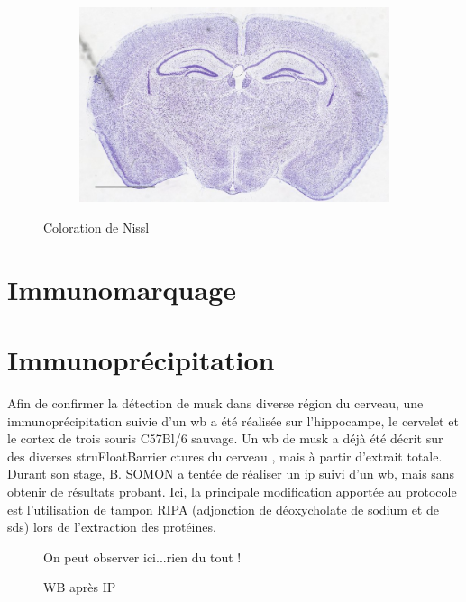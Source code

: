 \begin{figure}[h]
\begin{center}
\begin{subfigure}[h]{0.49\textwidth}
		\end{subfigure}
		\begin{subfigure}[h]{0.49\textwidth}%
			\caption{}
			\label{fig:MaleMutNissl}
			\includegraphics[width=\textwidth]{./Images/Nissl/MaleMut.jpg}
		\end{subfigure}
	\end{center}
	\caption{Coloration de Nissl}
	\label{fig:NisslResultat}
\end{figure}

\section{Immunomarquage}

\section{Immunoprécipitation}
\label{sec:IPresultat}
Afin de confirmer la détection de \gls{musk} dans diverse région du cerveau, une immunoprécipitation suivie d'un \gls{wb} a été réalisée sur l'hippocampe, le cervelet et le cortex de trois souris C57Bl/6 sauvage. Un \gls{wb} de \gls{musk} a déjà été décrit sur des diverses struFloatBarrier
ctures du cerveau \cite{Garcia-Osta2006}, mais à partir d'extrait totale. Durant son stage, B. SOMON a tentée de réaliser un \gls{ip} suivi d'un \gls{wb}, mais sans obtenir de résultats probant. Ici, la principale modification apportée au protocole est l'utilisation de tampon RIPA (adjonction de déoxycholate de sodium et de \acrshort{sds}) lors de l'extraction des protéines.

\begin{figure}[h]
	\caption{WB après IP}{On peut observer ici...rien du tout !}
	\label{fig:WBMuSK}
\end{figure}

